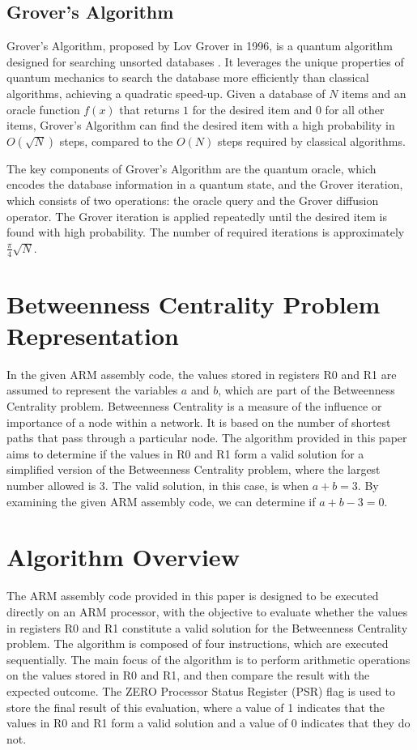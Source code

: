 \subsection{Grover's Algorithm}

Grover's Algorithm, proposed by Lov Grover in 1996, is a quantum algorithm designed for searching unsorted databases \cite{Grover1996}. It leverages the unique properties of quantum mechanics to search the database more efficiently than classical algorithms, achieving a quadratic speed-up. Given a database of $N$ items and an oracle function $f(x)$ that returns $1$ for the desired item and $0$ for all other items, Grover's Algorithm can find the desired item with a high probability in $O(\sqrt{N})$ steps, compared to the $O(N)$ steps required by classical algorithms.

The key components of Grover's Algorithm are the quantum oracle, which encodes the database information in a quantum state, and the Grover iteration, which consists of two operations: the oracle query and the Grover diffusion operator. The Grover iteration is applied repeatedly until the desired item is found with high probability. The number of required iterations is approximately $\frac{\pi}{4}\sqrt{N}$.



\section{Betweenness Centrality Problem Representation}

In the given ARM assembly code, the values stored in registers R0 and R1 are assumed to represent the variables $a$ and $b$, which are part of the Betweenness Centrality problem. Betweenness Centrality is a measure of the influence or importance of a node within a network. It is based on the number of shortest paths that pass through a particular node. The algorithm provided in this paper aims to determine if the values in R0 and R1 form a valid solution for a simplified version of the Betweenness Centrality problem, where the largest number allowed is 3. The valid solution, in this case, is when $a + b = 3$. By examining the given ARM assembly code, we can determine if $a + b - 3 = 0$.

\section{Algorithm Overview}

The ARM assembly code provided in this paper is designed to be executed directly on an ARM processor, with the objective to evaluate whether the values in registers R0 and R1 constitute a valid solution for the Betweenness Centrality problem. The algorithm is composed of four instructions, which are executed sequentially. The main focus of the algorithm is to perform arithmetic operations on the values stored in R0 and R1, and then compare the result with the expected outcome. The ZERO Processor Status Register (PSR) flag is used to store the final result of this evaluation, where a value of 1 indicates that the values in R0 and R1 form a valid solution and a value of 0 indicates that they do not.

